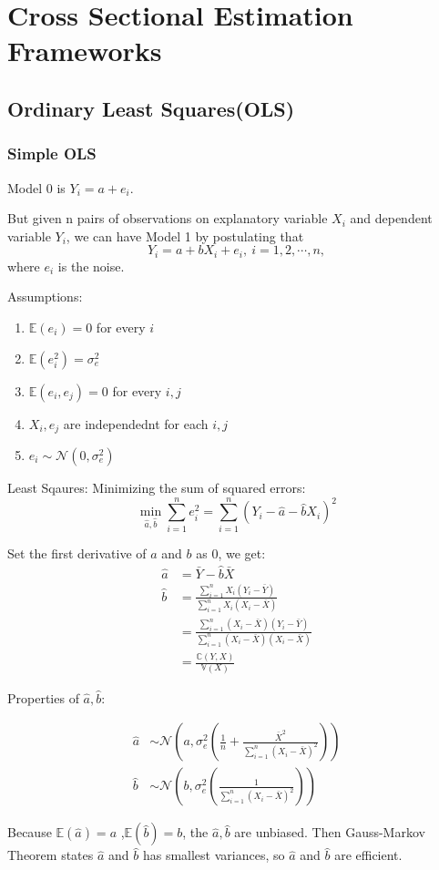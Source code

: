 \section{Cross Sectional Estimation Frameworks}
\subsection{Ordinary Least Squares(OLS)}
\subsubsection{Simple OLS}

Model 0 is $Y_i = a+e_i$.

But given n pairs of observations on explanatory variable $X_i$ and dependent variable $Y_i$, we can have Model 1 by postulating that
\[
    Y_i = a + bX_i + e_i, \ i=1,2,\cdots,n,
\]
where $e_i$ is the noise.

Assumptions:
\begin{enumerate}
    \item $\mathbb{E}(e_i) = 0$ for every $i$
    \item $\mathbb{E}(e_i^2) = \sigma_e^2$
    \item $\mathbb{E}(e_i,e_j) = 0$ for every $i,j$
    \item $X_i,e_j$ are independednt for each $i,j$
    \item $e_i\sim \mathcal{N}(0,\sigma_e^2)$
\end{enumerate}

Least Sqaures: Minimizing the sum of squared errors:
\[
     \min_{\hat{a},\hat{b}}\sum_{i=1}^n e_i^2 = \sum_{i=1}^n(Y_i-\hat{a}-\hat{b}X_i)^2
\]

Set the first derivative of $a$ and $b$ as 0, we get:
\[
    \begin{aligned}
        \hat{a} &= \bar{Y} - \hat{b}\bar{X}\\
        \hat{b} &= \frac{\sum_{i=1}^nX_i(Y_i-\bar{Y})}{\sum_{i=1}^nX_i(X_i-\bar{X})}    \\
        &=\frac{\sum_{i=1}^n(X_i-\bar{X})(Y_i-\bar{Y})}{\sum_{i=1}^n(X_i-\bar{X})(X_i-\bar{X})}\\
        &=\frac{\mathbb{C}(Y,X)}{\mathbb{V}(X)}
    \end{aligned}
\] 

Properties of $\hat{a},\hat{b}$:

\[
    \begin{aligned}
        \hat{a} &\sim \mathcal{N}\left(a,\sigma_e^2\left(\frac{1}{n}+\frac{\bar{X}^2}{\sum_{i=1}^n\left(X_i-\bar{X}\right)^2}\right)\right)\\
        \hat{b} &\sim \mathcal{N}\left(b,\sigma_e^2\left(\frac{1}{\sum_{i=1}^n\left(X_i-\bar{X}\right)^2}\right)\right)
    \end{aligned}
\]
\begin{note}
    Because $\mathbb{E}(\hat{a}) = a$ ,$\mathbb{E}(\hat{b}) = b$, the $\hat{a}, \hat{b}$ are unbiased. Then Gauss-Markov Theorem states $\hat{a}$ and $\hat{b}$ has smallest variances, so $\hat{a}$ and $\hat{b}$ are efficient.
\end{note}

